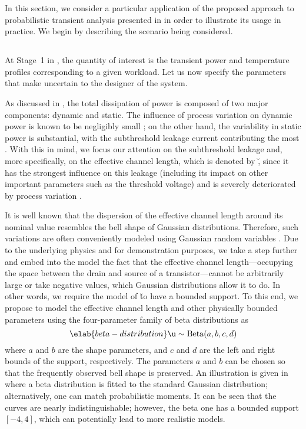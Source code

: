 In this section, we consider a particular application of the proposed approach
to probabilistic transient analysis presented in 
in order to illustrate its usage in practice. We begin by describing the
scenario being considered.

\subsection{\problemtitle}

At Stage~1 in , the quantity of interest \g is the
transient power and temperature profiles corresponding to a given workload. Let
us now specify the parameters \vu that make \g uncertain to the designer of the
system.

As discussed in , the total dissipation of power is composed
of two major components: dynamic and static. The influence of process variation
on dynamic power is known to be negligibly small \cite{srivastava2010}; on the
other hand, the variability in static power is substantial, with the
subthreshold leakage current contributing the most \cite{juan2011, juan2012}.
With this in mind, we focus our attention on the subthreshold leakage and, more
specifically, on the effective channel length, which is denoted by \u, since it
has the strongest influence on this leakage (including its impact on other
important parameters such as the threshold voltage) and is severely deteriorated
by process variation \cite{chandrakasan2000}.

It is well known that the dispersion of the effective channel length around its
nominal value resembles the bell shape of Gaussian distributions. Therefore,
such variations are often conveniently modeled using Gaussian random variables
\cite{bhardwaj2006, ghanta2006, huang2009a, shen2009, chandra2010,
srivastava2010, juan2011, juan2012, lee2013}. Due to the underlying physics and
for demonstration purposes, we take a step further and embed into the model the
fact that the effective channel length---occupying the space between the drain
and source of a transistor---cannot be arbitrarily large or take negative
values, which Gaussian distributions allow it to do. In other words, we require
the model of \u to have a bounded support. To this end, we propose to model the
effective channel length and other physically bounded parameters using the
four-parameter family of beta distributions as
\begin{equation} \elab{beta-distribution}
  \u \sim \mathrm{Beta}(a, b, c, d)
\end{equation}
where $a$ and $b$ are the shape parameters, and $c$ and $d$ are the left and
right bounds of the support, respectively. The parameters $a$ and $b$ can be
chosen so that the frequently observed bell shape is preserved. An illustration
is given in  where a beta distribution is fitted to
the standard Gaussian distribution; alternatively, one can match probabilistic
moments. It can be seen that the curves are nearly indistinguishable; however,
the beta one has a bounded support $[-4, 4]$, which can potentially lead to more
realistic models.

